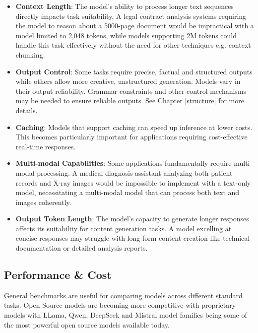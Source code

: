 \begin{itemize}
    \item \textbf{Context Length}: The model's ability to process longer text sequences directly impacts task suitability. A legal contract analysis systems requiring the model to reason about a 5000-page document would be impractical with a model limited to 2,048 tokens, while models supporting 2M tokens could handle this task effectively without the need for other techniques e.g. context chunking.

    \item \textbf{Output Control}: Some tasks require precise, factual and structured outputs while others allow more creative, unstructured generation. Models vary in their output reliability. Grammar constraints and other control mechanisms may be needed to ensure reliable outputs. See Chapter \ref{structure} for more details.

    \item \textbf{Caching}: Models that support caching can speed up inference at lower costs. This becomes particularly important for applications requiring cost-effective real-time responses.

    \item \textbf{Multi-modal Capabilities}: Some applications fundamentally require multi-modal processing. A medical diagnosis assistant analyzing both patient records and X-ray images would be impossible to implement with a text-only model, necessitating a multi-modal model that can process both text and images coherently.

    \item \textbf{Output Token Length}: The model's capacity to generate longer responses affects its suitability for content generation tasks. A model excelling at concise responses may struggle with long-form content creation like technical documentation or detailed analysis reports.
\end{itemize}

\subsection{Performance \& Cost}

General benchmarks are useful for comparing models across different standard tasks. Open Source models are becoming more competitive with proprietary models with LLama, Qwen, DeepSeek and Mistral model families being some of the most powerful open source models available today.


